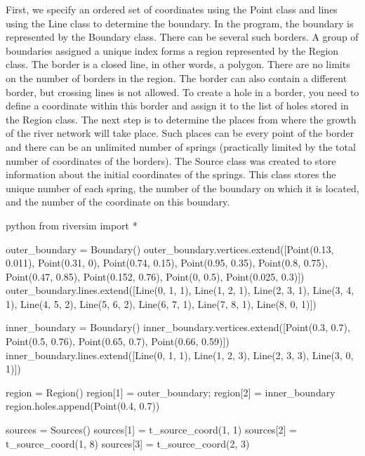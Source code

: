 \documentclass[]{pracamgr}
\begin{document}
      First, we specify an ordered set of coordinates using the Point class and lines using the Line class to determine the boundary. In the program, the boundary is represented by the Boundary class. There can be several such borders. A group of boundaries assigned a unique index forms a region represented by the Region class. The border is a closed line, in other words, a polygon. There are no limits on the number of borders in the region. The border can also contain a different border, but crossing lines is not allowed. To create a hole in a border, you need to define a coordinate within this border and assign it to the list of holes stored in the Region class. The next step is to determine the places from where the growth of the river network will take place. Such places can be every point of the border and there can be an unlimited number of springs (practically limited by the total number of coordinates of the borders). The Source class was created to store information about the initial coordinates of the springs. This class stores the unique number of each spring, the number of the boundary on which it is located, and the number of the coordinate on this boundary.

      \begin{mintedbox}{python}
        from riversim import *

        outer_boundary = Boundary()
        outer_boundary.vertices.extend([Point(0.13, 0.011), Point(0.31, 0), Point(0.74, 0.15), Point(0.95, 0.35), Point(0.8, 0.75), Point(0.47, 0.85), Point(0.152, 0.76), Point(0, 0.5), Point(0.025, 0.3)])
        outer_boundary.lines.extend([Line(0, 1, 1), Line(1, 2, 1), Line(2, 3, 1), Line(3, 4, 1), Line(4, 5, 2), Line(5, 6, 2), Line(6, 7, 1), Line(7, 8, 1), Line(8, 0, 1)])

        inner_boundary = Boundary()
        inner_boundary.vertices.extend([Point(0.3, 0.7), Point(0.5, 0.76), Point(0.65, 0.7), Point(0.66, 0.59)])
        inner_boundary.lines.extend([Line(0, 1, 1), Line(1, 2, 3), Line(2, 3, 3), Line(3, 0, 1)])

        region = Region()
        region[1] = outer_boundary; region[2] = inner_boundary
        region.holes.append(Point(0.4, 0.7))

        sources = Sources()
        sources[1] = t_source_coord(1, 1) 
        sources[2] = t_source_coord(1, 8) 
        sources[3] = t_source_coord(2, 3)\end{mintedbox}
\end{document}

